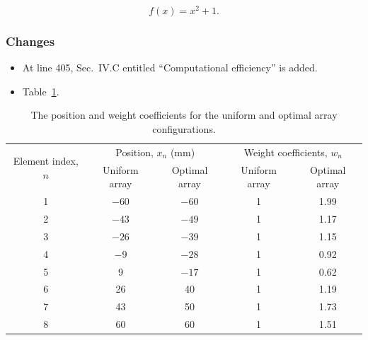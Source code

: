 \documentclass{RebuttalLetter}
\begin{document}
\begin{equation}
    f(x) = x^2 + 1.
    \label{eq:ex}
\end{equation}

\subsubsection*{Changes}
\begin{itemize}
    \item At line 405,
          Sec.~IV.C entitled ``Computational efficiency'' is added.
    \item Table~\ref{tab:2}.
\end{itemize}


\begin{table}
    \caption{The position and weight coefficients for the uniform and optimal array configurations.}
    \label{tab:2}
    \centering
    \begin{tabular}{ccccc}
        \toprule
        \multirow{2}{4em}{Element index, $n$ }
          & \multicolumn{2}{c}{Position, $x_n$ (mm)}
          & \multicolumn{2}{c}{Weight coefficients, $w_n$}
        \\
          & Uniform array                                  & Optimal array
          & Uniform array                                  & Optimal array            \\
        \midrule
        1 & $-60$                                          & $-60$         & 1 & 1.99 \\
        2 & $-43$                                          & $-49$         & 1 & 1.17 \\
        3 & $-26$                                          & $-39$         & 1 & 1.15 \\
        4 & $-9$                                           & $-28$         & 1 & 0.92 \\
        5 & 9                                              & $-17$         & 1 & 0.62 \\
        6 & 26                                             & 40            & 1 & 1.19 \\
        7 & 43                                             & 50            & 1 & 1.73 \\
        8 & 60                                             & 60            & 1 & 1.51 \\
        \bottomrule
    \end{tabular}
\end{table}
\end{document}
